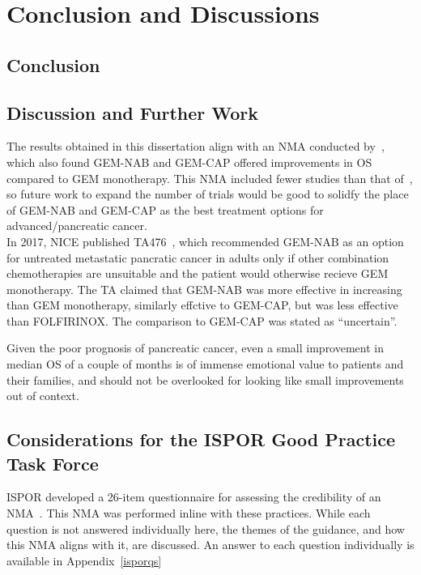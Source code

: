 \chapter{Conclusion and Discussions}\label{conclusions}

\section{Conclusion}

\section{Discussion and Further Work}
The results obtained in this dissertation align with an NMA conducted by~\cite{gresham2014}, which also found GEM-NAB and GEM-CAP offered improvements in OS compared to GEM monotherapy. This NMA included fewer studies than that of~\cite{gresham2014}, so future work to expand the number of trials would be good to solidfy the place of GEM-NAB and GEM-CAP as the best treatment options for advanced/pancreatic cancer. \\

In 2017, NICE published TA476~\cite{TA476}, which recommended GEM-NAB as an option for untreated metastatic pancratic cancer in adults only if other combination chemotherapies are unsuitable and the patient would otherwise recieve GEM monotherapy. The TA claimed that GEM-NAB was more effective in increasing than GEM monotherapy, similarly effctive to GEM-CAP, but was less effective than FOLFIRINOX. The comparison to GEM-CAP was stated as ``uncertain''.


Given the poor prognosis of pancreatic cancer, even a small improvement in median OS of a couple of months is of immense emotional value to patients and their families, and should not be overlooked for looking like small improvements out of context.

\section{Considerations for the ISPOR Good Practice Task Force}
ISPOR developed a 26-item questionnaire for assessing the credibility of an NMA~\cite{jansengp}. This NMA was performed inline with these practices. While each question is not answered individually here, the themes of the guidance, and how this NMA aligns with it, are discussed. An answer to each question individually is available in Appendix~\ref{isporqs}\\

